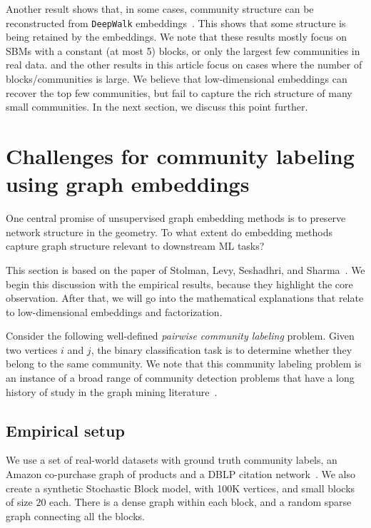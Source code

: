 \documentclass[11pt]{article}
\begin{document}
Another result shows that, in some cases, community structure can be reconstructed
from {\tt DeepWalk} embeddings~\cite{ChMu+21}. This shows that some structure
is being retained by the embeddings. We note that these results mostly
focus on SBMs with a constant (at most 5) blocks, or only the largest few communities
in real data.  and the other results in this article focus on cases where
the number of blocks/communities is large. We believe that low-dimensional embeddings
can recover the top few communities, but fail to capture the rich structure 
of many small communities. In the next section, we discuss this point further.



\section{Challenges for community labeling using graph embeddings} \label{sec:poor-comm}

One central promise of unsupervised graph embedding methods is to
preserve network structure in the geometry.
To what extent do embedding methods capture
graph structure relevant to downstream ML tasks?

This section is based on the paper of Stolman, Levy, Seshadhri, and Sharma~\cite{StLe+22}.
We begin this discussion with the empirical results, because they
highlight the core observation. After that, we will go into the mathematical
explanations that relate to low-dimensional embeddings and factorization.

Consider the following well-defined \emph{pairwise
  community labeling} problem. Given two vertices $i$ and $j$, the
binary classification task is to determine whether they belong to the
same community. We note that this community labeling problem is an
instance of a broad range of community detection problems that have a
long history of study in the graph mining
literature~\cite{mmds_book}. 


\subsection{Empirical setup} \label{sec:comm-setup}

We use a set of real-world datasets with ground truth community labels,
an Amazon co-purchase graph of products and a DBLP citation network~\cite{YaLe12}.
We also create a synthetic Stochastic Block model, with 100K vertices,
and small blocks of size $20$ each. There is a dense graph within each block,
and a random sparse graph connecting all the blocks.
\end{document}
